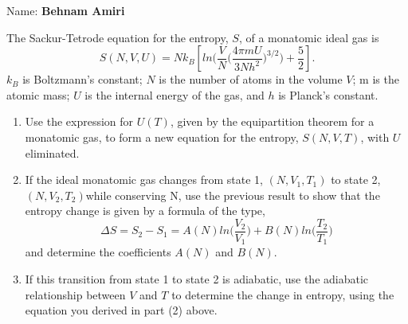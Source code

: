 \documentclass[fleqn]{article}
\begin{document}
  Name: \textbf{Behnam Amiri}

  \vspace{1cm}

  The Sackur-Tetrode equation for the entropy, $S$, of a monatomic ideal gas is
  $$
    S(N,V,U)=N k_B \left[
      ln \bigg( \dfrac{V}{N} \bigg( \dfrac{4 \pi m U}{3 N h^2} \bigg)^{3/2}\bigg)+\dfrac{5}{2}
    \right].
  $$
  $k_B$ is Boltzmann's constant; $N$ is the number of atoms in the volume $V$; m is the atomic mass; $U$
  is the internal energy of the gas, and $h$ is Planck's constant.

  \begin{enumerate}
    \item Use the expression for $U(T)$, given by the equipartition theorem for a monatomic gas, to form
    a new equation for the entropy, $S(N,V,T)$, with $U$ eliminated.


    \item If the ideal monatomic gas changes from state 1, $(N,V_1,T_1)$ to state 2, $(N,V_2,T_2) $while 
    conserving N, use the previous result to show that the entropy change is given by a formula of the type,
    $$
      \Delta S=S_2-S_1=A(N) ln \bigg( \dfrac{V_2}{V_1} \bigg)+B(N) ln \bigg( \dfrac{T_2}{T_1} \bigg)
    $$
    and determine the coefficients $A(N)$ and $B(N)$.


    \item If this transition from state 1 to state 2 is adiabatic, use the adiabatic relationship between $V$
    and $T$ to determine the change in entropy, using the equation you derived in part (2) above.


  \end{enumerate}
\end{document}
